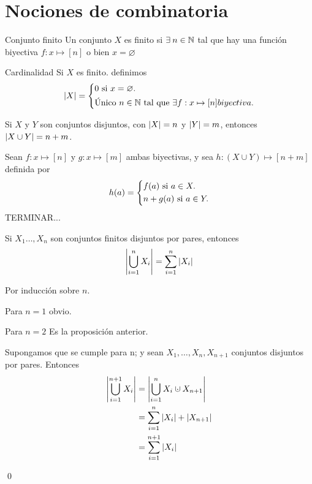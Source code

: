 \section{Nociones de combinatoria}
	\begin{definition}{Conjunto finito}
		Un conjunto $X$ es finito si $\exists\:n\in\mathbb{N}$ tal que hay una función biyectiva $f:x\mapsto[n]$ o bien $x=\varnothing$ 
	\end{definition}
	\begin{definition}{Cardinalidad}
		Si $X$ es finito. definimos
		\[
			\abs{X}=
			\begin{dcases}
				0\text{ si }x=\varnothing.\\
				\text{Único $n\in\mathbb{N}$ tal que $\exists f:x\mapsto[n]$} biyectiva.
			\end{dcases}
		\]
	\end{definition}
	\begin{theorem}{}
		Si $X$ y $Y$ son conjuntos disjuntos, con $\abs{X}=n$ y $\abs{Y}=m$, entonces $\abs{X\cup Y}=n+m$.
	\end{theorem}
	\begin{demostration}{}
		Sean $f:x\mapsto[n]$ y $g:x\mapsto[m]$ ambas biyectivas, y sea $h:(X\cup Y)\mapsto[n+m]$ definida por
		\[
		h(a)=
		\begin{dcases}
			f(a)\text{ si }a\in X.\\
			n+g(a)\text{ si }a\in Y.
		\end{dcases}
		\]
		TERMINAR...
	\end{demostration}
	\begin{corollary}{}
		Si $X_1\dotso,X_n$ son conjuntos finitos disjuntos por pares, entonces
		$$\abs{\bigcup_{i=1}^{n}{X_i}}=\sum_{i=1}^{n}{\abs{X_i}}$$
	\end{corollary}
	\begin{demostration}{}
		Por inducción sobre $n$.
		
		Para $n=1$ obvio.

		Para $n=2$ Es la proposición anterior.
		
		Supongamos que se cumple para n; y sean $X_1,\dotso,X_n,X_{n+1}$ conjuntos disjuntos por pares. Entonces
		\begin{align*}
			\abs{\bigcup_{i=1}^{n+1}{X_i}}&=\abs{\bigcup_{i=1}^{n}{X_i}\cupdot X_{n+1}}\\
			&=\sum_{i=1}^{n}{\abs{X_i}}+\abs{X_{n+1}}\\
			&=\sum_{i=1}^{n+1}{\abs{X_i}}
		\end{align*}
		\begin{flushright}
			\qed
		\end{flushright}
	\end{demostration}
